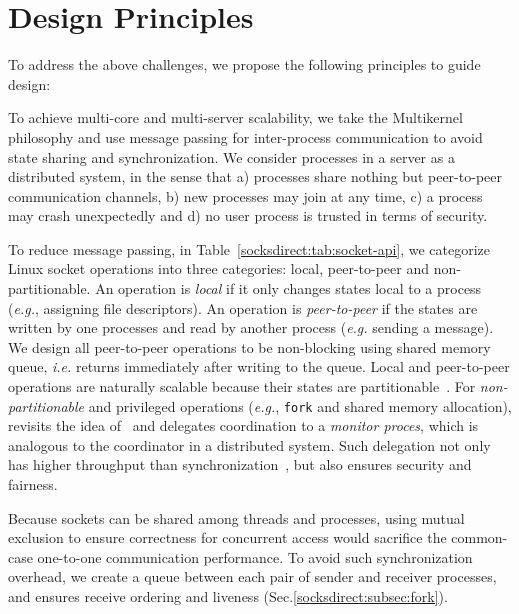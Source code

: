 \section{Design Principles}
\label{socksdirect:sec:architecture}

To address the above challenges, we propose the following principles to guide \sys design:

To achieve multi-core and multi-server scalability, we take the Multikernel~\cite{baumann2009multikernel} philosophy and use message passing for inter-process communication to avoid state sharing and synchronization. We consider processes in a server as a distributed system, in the sense that a) processes share nothing but peer-to-peer communication channels, b) new processes may join at any time, c) a process may crash unexpectedly and d) no user process is trusted in terms of security. 

To reduce message passing, in Table~\ref{socksdirect:tab:socket-api}, we categorize Linux socket operations into three categories: local, peer-to-peer and non-partitionable. An operation is \textit{local} if it only changes states local to a process (\textit{e.g.}, assigning file descriptors). An operation is \textit{peer-to-peer} if the states are written by one processes and read by another process (\textit{e.g.} sending a message).
We design all peer-to-peer operations to be non-blocking using shared memory queue, \textit{i.e.} returns immediately after writing to the queue. 
Local and peer-to-peer operations are naturally scalable because their states are partitionable~\cite{partitionable}. For \textit{non-partitionable} and privileged operations (\textit{e.g.}, \texttt{fork} and shared memory allocation), \sys revisits the idea of~\cite{hoare1974monitors} and delegates coordination to a \emph{monitor proces}, which is analogous to the coordinator in a distributed system. Such delegation not only has higher throughput than synchronization~\cite{roghanchi2017ffwd}, but also ensures security and fairness.

Because sockets can be shared among threads and processes, using mutual exclusion to ensure correctness for concurrent access would sacrifice the common-case one-to-one communication performance. To avoid such synchronization overhead, we create a queue between each pair of sender and receiver processes, and ensures receive ordering and liveness (Sec.\ref{socksdirect:subsec:fork}).

